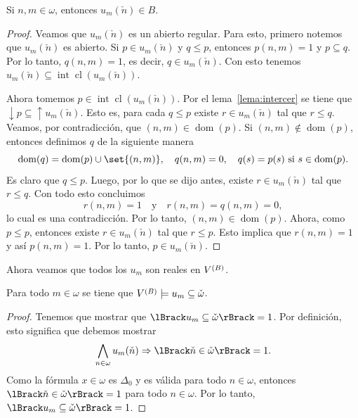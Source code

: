 \documentclass[letterpaper,DIV=15,12pt]{scrartcl}
\DeclarePairedDelimiter{\vb}{\lBrack}{\rBrack}             %
\DeclareMathOperator{\dom}{dom}                            %
\DeclareMathOperator{\arriba}{\uparrow}                    %
\DeclareMathOperator{\abajo}{\downarrow}                   %
\DeclareMathOperator{\inte}{int}                           %
\DeclareMathOperator{\cer}{cl}                             %
\begin{document}
\begin{proposition}
    Si \(n,m\in\omega\), entonces \(u_m(\check{n})\in B\).
\end{proposition}
\begin{proof}
    Veamos que \(u_m(\check{n})\) es un abierto regular. Para esto, primero
    notemos que \(u_m(\check{n})\) es abierto. Si \(p\in u_m(\check{n})\)
    y \(q\leq p\), entonces \(p(n,m)=1\) y \(p\subseteq q\). Por lo tanto,
    \(q(n,m)=1\), es decir, \(q\in u_m(\check{n})\). Con esto tenemos
    \(u_m(\check{n})\subseteq\inte\cer(u_m(\check{n}))\).

    Ahora tomemos \(p\in\inte\cer(u_m(\check{n}))\). Por el
    lema~\ref{lema:intercer} se tiene que 
    \(\abajo p\subseteq\arriba u_m(\check{n})\). Esto es, para cada \(q\leq p\)
    existe \(r\in u_m(\check{n})\) tal que \(r\leq q\). Veamos, por
    contradicción, que \((n,m)\in\dom(p)\). Si \((n,m)\notin\dom(p)\), entonces
    definimos \(q\) de la siguiente manera
    \begin{equation*}
        \dom(q)=\dom(p)\cup\set{(n,m)}, \quad q(n,m)=0, 
        \quad q(s)=p(s) \text{ si } s\in\dom(p).
    \end{equation*}
    Es claro que \(q\leq p\). Luego, por lo que se dijo antes, existe 
    \(r\in u_m(\check{n})\) tal que \(r\leq q\). Con todo esto concluimos
    \begin{equation*}
        r(n,m)=1 \quad\text{y}\quad r(n,m)=q(n,m)=0,
    \end{equation*}
    lo cual es una contradicción. Por lo tanto, \((n,m)\in\dom(p)\). Ahora, como
    \(p\leq p\), entonces existe \(r\in u_m(\check{n})\) tal que \(r\leq p\).
    Esto implica que \(r(n,m)=1\) y así \(p(n,m)=1\). Por lo tanto, 
    \(p\in u_m(\check{n})\). 
\end{proof}

Ahora veamos que todos los \(u_m\) son reales en \(\mb\).

\begin{lemma}
    Para todo \(m\in\omega\) se tiene que 
    \(\mb\models u_m\subseteq\check{\omega}\).
\end{lemma}
\begin{proof}
    Tenemos que mostrar que \(\vb{u_m\subseteq\check{\omega}}=1\). Por
    definición, esto significa que debemos mostrar
    \begin{equation*}
        \bigwedge_{n\in\omega} u_m(\check{n})\Rightarrow\vb{\check{n}\in\check{\omega}}=1.
    \end{equation*}
    Como la fórmula \(x\in\omega\) es \(\Delta_0\) y es válida para todo
    \(n\in\omega\), entonces \(\vb{\check{n}\in\check{\omega}}=1\) para todo
    \(n\in\omega\). Por lo tanto, \(\vb{u_m\subseteq\check{\omega}}=1\).
\end{proof}
\end{document}
